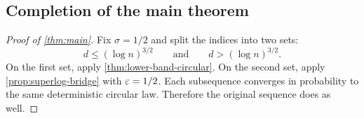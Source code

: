 \subsection{Completion of the main theorem}

\begin{proof}[Proof of \cref{thm:main}]
Fix $\sigma=1/2$ and split the indices into two sets:
\[
  d\le(\log n)^{3/2}
  \qquad\text{and}\qquad
  d>(\log n)^{3/2}.
\]
On the first set, apply \cref{thm:lower-band-circular}. On the second set, apply \cref{prop:superlog-bridge} with $\varepsilon=1/2$. Each subsequence converges in probability to the same deterministic circular law. Therefore the original sequence does as well.
\end{proof}
